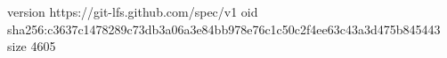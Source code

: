 version https://git-lfs.github.com/spec/v1
oid sha256:c3637c1478289c73db3a06a3e84bb978e76c1c50c2f4ee63c43a3d475b845443
size 4605
